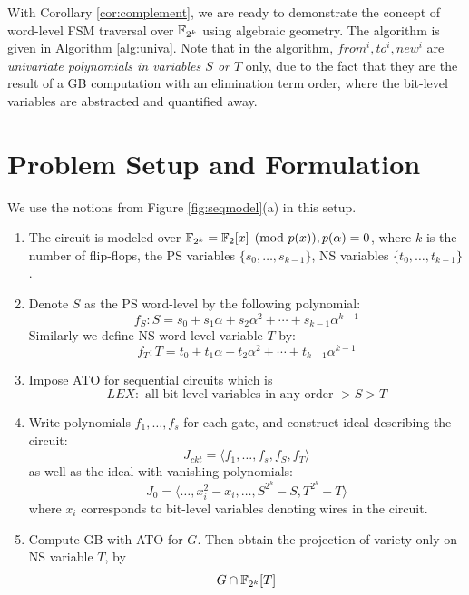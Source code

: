 With Corollary \ref{cor:complement}, we are ready to demonstrate the
concept of word-level FSM traversal over ${\mathbb{F}}_{2^k}$ using algebraic
geometry. The algorithm is given in Algorithm \ref{alg:univa}. Note that in
the algorithm, $from^i, to^i, new^i$ are {\it univariate polynomials in variables $S$
or $T$} only, due to the fact that they are the result of a GB
computation with an elimination term order, where the bit-level 
variables are abstracted and quantified away.

\section{Problem Setup and Formulation}
\begin{Problem}
We use the notions from Figure \ref{fig:seqmodel}(a) in this setup. 
\begin{enumerate}[{1)}] 
\item The circuit is modeled over ${\mathbb{F}}_{2^k} = {\mathbb{F}}_2[x]\pmod{p(x)}, p(\alpha) = 0$, where $k$ is the number of flip-flops,
	the PS variables $\{s_0,\dots,s_{k-1}\}$, NS variables $\{t_0,\dots,t_{k-1}\}$.
\item Denote $S$ as the PS word-level by the following polynomial:
$$f_S: S = s_0+s_1\alpha+s_2\alpha^2+\cdots+s_{k-1}\alpha^{k-1}$$
Similarly we define NS word-level variable $T$ by:
$$f_T: T = t_0+t_1\alpha+t_2\alpha^2+\cdots+t_{k-1}\alpha^{k-1}$$
\item Impose ATO for sequential circuits which is 
$$LEX: \text{ all bit-level variables in any order }>S>T$$
\item Write polynomials $f_1,\dots,f_s$ for each gate, and construct ideal describing the circuit:
$$J_{ckt} = \langle f_1,\dots,f_s,f_S,f_T\rangle$$
as well as the ideal with vanishing polynomials:
$$J_0 = \langle \dots,x_i^2-x_i,\dots,S^{2^k}-S,T^{2^k}-T\rangle$$
where $x_i$ corresponds to bit-level variables denoting wires in the circuit.
\item Compute GB with ATO for $G$. Then obtain the projection of variety only on NS variable $T$, by
$$G\cap {\mathbb{F}}_{2^k}[T]$$
\end{enumerate}
\end{Problem}


